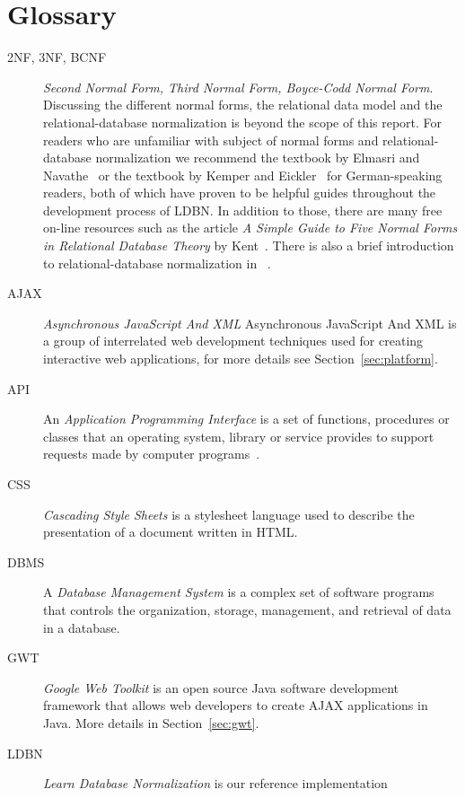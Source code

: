 
\section{Glossary}
\begin{description}
	\item[2NF, 3NF, BCNF] \emph{Second Normal Form, Third Normal Form, Boyce-Codd Normal Form}. 
	  Discussing the different normal forms, the relational  data model and the relational-database normalization
    is beyond the scope of this report. 
	  For readers who are unfamiliar with subject of normal forms and relational-database
    normalization we recommend the textbook by Elmasri and Navathe~\cite{bdb1} or
    the textbook by Kemper and Eickler~\cite{bdb2} for German-speaking readers, both of which have 
    proven to be helpful guides throughout the development process of LDBN. 
    In addition to those, there are many free on-line resources such as the article 
    \emph{A Simple Guide to Five Normal Forms in Relational Database Theory} by Kent~\cite{p7}. 
    There is also a brief introduction to relational-database normalization in ~\cite[Chapter~2]{mt1}.
	\item[AJAX] \emph{Asynchronous JavaScript And XML} 
	  Asynchronous JavaScript And XML is a group of interrelated web development techniques 
	  used for creating interactive web applications, for more details see Section~\ref{sec:platform}.
	\item[API] An \emph{Application Programming Interface} is a set of functions, procedures or classes 
	  that an operating system, library or service provides to support requests
	  made by computer programs~\cite{wapi}.
	\item[CSS] \emph{Cascading Style Sheets} is a stylesheet language used to describe the 
	  presentation of a document written in HTML.
	\item[DBMS] A \emph{Database Management System} is a complex set of software programs that
	  controls the organization, storage, management, and retrieval of data in a database.
	\item[GWT] \emph{Google Web Toolkit} is an open source Java software development 
	  framework that allows web developers to create AJAX applications in Java. 
	  More details in Section~\ref{sec:gwt}.
	\item[LDBN] \emph{Learn Database Normalization} is our reference implementation 

\end{description}
